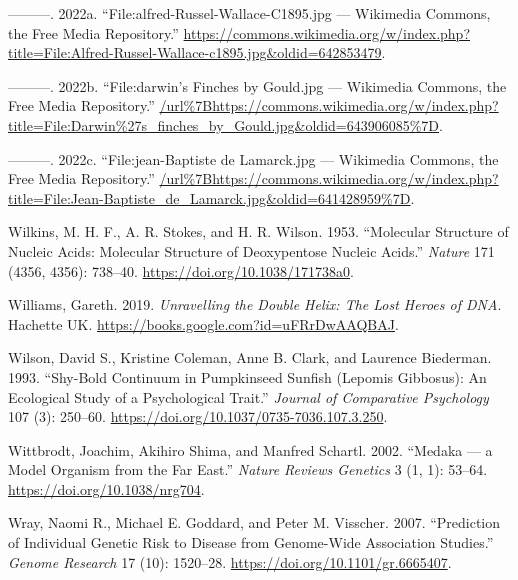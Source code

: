 \documentclass[
]{book}
\newlength{\cslhangindent}
\newlength{\cslentryspacingunit} %
\newenvironment{CSLReferences}[2] %
 {%
  \setlength{\parindent}{0pt}
  \ifodd #1
  \let\oldpar\par
  \def\par{\hangindent=\cslhangindent\oldpar}
  \fi
  \setlength{\parskip}{#2\cslentryspacingunit}
 }%
 {}
\begin{document}
\begin{CSLReferences}{1}{0}
\leavevmode{}%
---------. 2022a. {``File:alfred-Russel-Wallace-C1895.jpg --- Wikimedia Commons{,} the Free Media Repository.''} \url{https://commons.wikimedia.org/w/index.php?title=File:Alfred-Russel-Wallace-c1895.jpg\&oldid=642853479}.

\leavevmode{}%
---------. 2022b. {``File:darwin's Finches by Gould.jpg --- Wikimedia Commons{,} the Free Media Repository.''} \url{/url\%7Bhttps://commons.wikimedia.org/w/index.php?title=File:Darwin\%27s_finches_by_Gould.jpg\&oldid=643906085\%7D}.

\leavevmode{}%
---------. 2022c. {``File:jean-Baptiste de Lamarck.jpg --- Wikimedia Commons{,} the Free Media Repository.''} \url{/url\%7Bhttps://commons.wikimedia.org/w/index.php?title=File:Jean-Baptiste_de_Lamarck.jpg\&oldid=641428959\%7D}.

\leavevmode{}%
Wilkins, M. H. F., A. R. Stokes, and H. R. Wilson. 1953. {``Molecular {Structure} of {Nucleic Acids}: {Molecular Structure} of {Deoxypentose Nucleic Acids}.''} \emph{Nature} 171 (4356, 4356): 738--40. \url{https://doi.org/10.1038/171738a0}.

\leavevmode{}%
Williams, Gareth. 2019. \emph{Unravelling the {Double Helix}: {The Lost Heroes} of {DNA}}. {Hachette UK}. \url{https://books.google.com?id=uFRrDwAAQBAJ}.

\leavevmode{}%
Wilson, David S., Kristine Coleman, Anne B. Clark, and Laurence Biederman. 1993. {``Shy-Bold Continuum in Pumpkinseed Sunfish ({Lepomis} Gibbosus): {An} Ecological Study of a Psychological Trait.''} \emph{Journal of Comparative Psychology} 107 (3): 250--60. \url{https://doi.org/10.1037/0735-7036.107.3.250}.

\leavevmode{}%
Wittbrodt, Joachim, Akihiro Shima, and Manfred Schartl. 2002. {``Medaka --- a Model Organism from the Far East.''} \emph{Nature Reviews Genetics} 3 (1, 1): 53--64. \url{https://doi.org/10.1038/nrg704}.

\leavevmode{}%
Wray, Naomi R., Michael E. Goddard, and Peter M. Visscher. 2007. {``Prediction of Individual Genetic Risk to Disease from Genome-Wide Association Studies.''} \emph{Genome Research} 17 (10): 1520--28. \url{https://doi.org/10.1101/gr.6665407}.


\end{CSLReferences}
\end{document}
